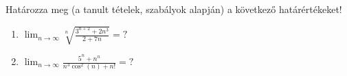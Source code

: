 \documentclass[11pt]{scrartcl}
\begin{document}
Határozza meg (a tanult tételek, szabályok alapján) a következő határértékeket!
\begin{enumerate}
	\item \(\displaystyle
	      \lim_{n \to \infty} \sqrt[n]{
		      \frac{3^{n + 2} + 2n^3}{2 + 7n}
	      } = ?
	      \)

	\item \(\displaystyle
	      \lim_{n \to \infty} \frac{
		      5^n + n^n
	      }{
		      n^3 \cos^2(n) + n!
	      } = ?
	      \)
\end{enumerate}
\end{document}

